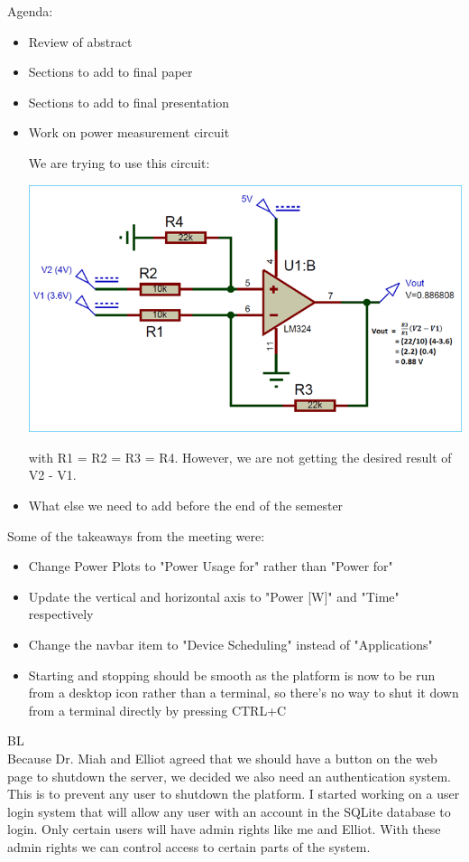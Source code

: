 \documentclass[fontsize=11pt, %
                             paper=letter, %
                             openany, %
                             captions=tableheading,
                             index=totoc,
                             hyperref]{labbook}
\begin{document}
Agenda:
\begin{itemize}
\item Review of abstract
\item Sections to add to final paper
\item Sections to add to final presentation
\item Work on power measurement circuit

We are trying to use this circuit:

\includegraphics[scale=0.6]{figs/beaglebone/voltageSubtractor.png}

with R1 = R2 = R3 = R4. However, we are not getting the desired result of V2 - V1.

\item What else we need to add before the end of the semester
\end{itemize}
Some of the takeaways from the meeting were:
\begin{itemize}
\item Change Power Plots to "Power Usage for" rather than "Power for"
\item Update the vertical and horizontal axis to "Power [W]" and "Time" respectively
\item Change the navbar item to "Device Scheduling" instead of "Applications"
\item Starting and stopping should be smooth as the platform is now to be run from a desktop icon rather than a terminal, so there's no way to shut it down from a terminal directly by pressing CTRL+C
\end{itemize}
BL\\
Because Dr. Miah and Elliot agreed that we should have a button on the web page to shutdown the server, we decided we also need an authentication system. This is to prevent any user to shutdown the platform. 
\medbreak\noindent
I started working on a user login system that will allow any user with an account in the SQLite database to login. Only certain users will have admin rights like me and Elliot. With these admin rights we can control access to certain parts of the system.
\end{document}
